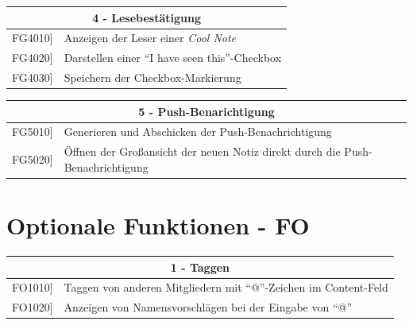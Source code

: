 \documentclass[a4paper]{scrreprt}
\begin{document}
    		\vspace{5mm}
    		
    		\begin{table}[h!]
    			\centering
    			\label{my-label}
    			\begin{tabular}{p{2cm}p{12cm}}
    				
    				\multicolumn{2}{c}{\textbf{4 - Lesebestätigung}} \\ \hline
    				\centering{[}FG4010{]} & Anzeigen der Leser einer \textit{Cool Note}\\
    				\centering{[}FG4020{]}& Darstellen einer “I have seen this”-Checkbox                               \\
    				\centering{[}FG4030{]}& Speichern der Checkbox-Markierung \\ 
    				
    				\hline
    			\end{tabular}
    		\end{table}
    		
    		\vspace{5mm}
    		
    		\begin{table}[h!]
    			\centering
    			\label{my-label}
    			\begin{tabular}{p{2cm}p{12cm}}
    				
    				\multicolumn{2}{c}{\textbf{5 - Push-Benarichtigung}} \\ \hline
    				\centering{[}FG5010{]} & Generieren und Abschicken der Push-Benachrichtigung\\
    				\centering{[}FG5020{]}&Öffnen der Großansicht der neuen Notiz direkt durch die Push-Benachrichtigung            \\ 
    				
    				\hline
    			\end{tabular}
    		\end{table}
    		
    		\vspace{1cm}
    		
    		\section{Optionale Funktionen - FO}
    		
    		\begin{table}[h!]
    			\centering
    			\label{my-label}
    			\begin{tabular}{p{2cm}p{12cm}}
    				
    				\multicolumn{2}{c}{\textbf{1 - Taggen}} \\ \hline
    				\centering{[}FO1010{]} & Taggen von anderen Mitgliedern mit “@”-Zeichen im Content-Feld\\
    				\centering{[}FO1020{]}& Anzeigen von Namensvorschlägen bei der Eingabe von “@”                               \\
    				\hline
    			\end{tabular}
    		\end{table}
    		
\end{document}

